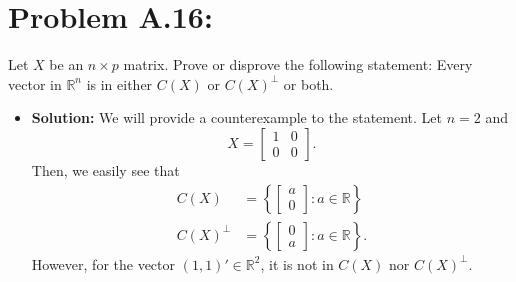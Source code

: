 \documentclass[11pt]{article}
\newcommand{\R}{{\mathbb R}}
\begin{document}
\section*{Problem A.16:}  Let $X$ be an $n\times p$ matrix.  Prove or disprove the following statement:  Every vector in $\R^n$ is in either $C(X)$ or $C(X)^\perp$ or both.
\begin{itemize}
\item[] {\bf Solution:}  We will provide a counterexample to the statement.  Let $n=2$ and
\[
X = \begin{bmatrix}
1 & 0 \\
0 & 0
\end{bmatrix}.
\]
Then, we easily see that 
\begin{align*}
C(X) &= \left\{\begin{bmatrix}
a \\ 0
\end{bmatrix} \colon a\in\R\right\} \\
C(X)^\perp &= \left\{\begin{bmatrix}
0 \\ a
\end{bmatrix} \colon a\in\R\right\}.
\end{align*}
However, for the vector $(1,1)'\in\R^2$, it is not in $C(X)$ nor $C(X)^\perp$.
\end{itemize}
\end{document}
